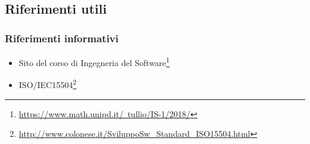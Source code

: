 \subsection{Riferimenti utili}
\subsubsection{Riferimenti informativi}
\begin{itemize}
	\item Sito del corso di Ingegneria del Software\footnote{\href{https://www.math.unipd.it/~tullio/IS-1/2018/}{https://www.math.unipd.it/~tullio/IS-1/2018/}}
	\item ISO/IEC15504\footnote{\href{http://www.colonese.it/SviluppoSw_Standard_ISO15504.html}{http://www.colonese.it/SviluppoSw\_{}Standard\_{}ISO15504.html}}
\end{itemize}

